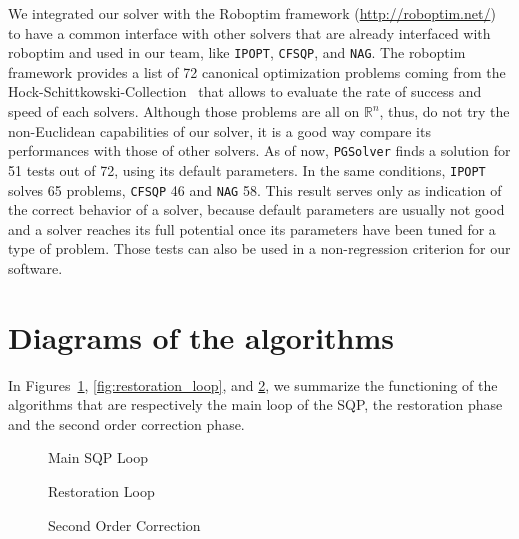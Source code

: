 We integrated our solver with the Roboptim framework (\href{http://roboptim.net/}{http://roboptim.net/}) to have a common interface with other solvers that are already interfaced with roboptim and used in our team, like {\tt IPOPT}, {\tt CFSQP}, and {\tt NAG}.
The roboptim framework provides a list of 72 canonical optimization problems coming from the Hock-Schittkowski-Collection~\cite{Hock1980} that allows to evaluate the rate of success and speed of each solvers.
Although those problems are all on $\mathbb{R}^n$, thus, do not try the non-Euclidean capabilities of our solver, it is a good way compare its performances with those of other solvers.
As of now, {\tt PGSolver} finds a solution for 51 tests out of 72, using its default parameters.
In the same conditions, {\tt IPOPT} solves 65 problems, {\tt CFSQP} 46 and {\tt NAG} 58.
This result serves only as indication of the correct behavior of a solver, because default parameters are usually not good and a solver reaches its full potential once its parameters have been tuned for a type of problem.
Those tests can also be used in a non-regression criterion for our software.


\section{Diagrams of the algorithms}
\label{sec:diagrams_of_the_algorithms}

In Figures~\ref{fig:main_sqp_loop}, \ref{fig:restoration_loop}, and \ref{fig:second_order_correction}, we summarize the functioning of the algorithms that are respectively the main loop of the SQP, the restoration phase and the second order correction phase.

\begin{figure}[H]
  \centering
  
  \caption{Main SQP Loop}
\label{fig:main_sqp_loop}
\end{figure}

\begin{figure}[H]
  \begin{minipage}{.5\textwidth}
    \centering
    
    \caption{Restoration Loop}
\label{fig:restoration_loop}
  \end{minipage}%
  \begin{minipage}{.5\textwidth}
    \centering
    
    \caption{Second Order Correction}
\label{fig:second_order_correction}
  \end{minipage}%
\end{figure}

